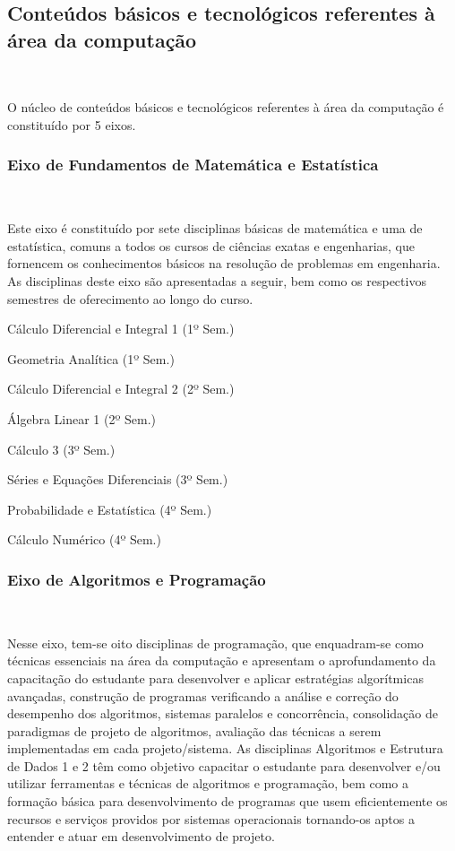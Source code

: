 \subsection{Conteúdos básicos e tecnológicos referentes à área da computação}~\label{sec:cb_tac}

O núcleo de conteúdos básicos e tecnológicos referentes à área da computação é constituído por 5 eixos.

\subsubsection{Eixo de Fundamentos de Matemática e Estatística}~\label{sec:E1}

Este eixo é constituído por sete disciplinas básicas de matemática e uma de estatística, comuns a todos os cursos de ciências exatas e engenharias, que fornencem os conhecimentos básicos na resolução de problemas em engenharia. As disciplinas deste eixo são apresentadas a seguir, bem como os respectivos semestres de oferecimento ao longo do curso.

\begin{compenum}
    \item Cálculo Diferencial e Integral 1 (1º Sem.)
    \item Geometria Analítica (1º Sem.)
    \item Cálculo Diferencial e Integral 2 (2º Sem.)
    \item Álgebra Linear 1 (2º Sem.)
    \item Cálculo 3 (3º Sem.)
    \item Séries e Equações Diferenciais (3º Sem.)
    \item Probabilidade e Estatística (4º Sem.)
    \item Cálculo Numérico (4º Sem.)
\end{compenum}

\subsubsection{Eixo de Algoritmos e Programação}~\label{sec:E4}

Nesse eixo, tem-se oito disciplinas de programação, que enquadram-se como técnicas essenciais na área da computação e apresentam o aprofundamento da capacitação do {estudante} para desenvolver e aplicar estratégias algorítmicas avançadas, construção de programas verificando a análise e correção do desempenho dos algoritmos, sistemas paralelos e concorrência, consolidação de paradigmas de projeto de algoritmos, avaliação das técnicas a serem implementadas em cada projeto/sistema.
As disciplinas Algoritmos e Estrutura de Dados 1 e 2 têm como objetivo capacitar o {estudante} para desenvolver e/ou utilizar ferramentas e técnicas de algoritmos e programação, bem como a formação básica para desenvolvimento de programas que usem eficientemente os recursos e serviços providos por sistemas operacionais tornando-os aptos a entender e atuar em desenvolvimento de projeto.

